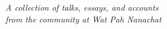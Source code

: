 
\vspace*{5em}

{\centering

{\Large\chapterTitleFont\scshape\thetitle}
\medskip

{\itshape
A collection of talks, essays, and accounts\\
from the community at Wat Pah Nanachat}
\bigskip

}

